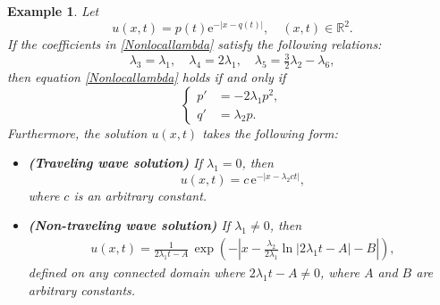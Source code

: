 \documentclass[11pt]{article}
\newtheorem{example}{Example}
\begin{document}
\begin{example}
    \label{1peakoncorollary}
Let
\[
u(x,t) =  p(t) \mathrm{e}^{-|x-q(t)|},\quad (x,t) \in \mathbb{R}^2.
\]
If the coefficients in \eqref{Nonlocallambda} satisfy  the following relations:
\[
\lambda_3 = \lambda_1,\quad \lambda_4 = 2\lambda_1,\quad \lambda_5 = \tfrac{3}{2}\lambda_2 - \lambda_6,
\]
then equation \eqref{Nonlocallambda} holds if and only if
\begin{equation}
\left\{
\begin{aligned}
    p' &= -2\lambda_1 p^2, \\
    q' &= \lambda_2 p.
\end{aligned}
\right.
\label{1peakonODE}
\end{equation}
Furthermore, the solution \( u(x,t) \) takes the following form:
\begin{itemize}
    \item \textbf{(Traveling wave solution)} If \( \lambda_1 = 0 \), then
    \[
    u(x,t) = c\, \mathrm{e}^{-|x - \lambda_2 ct|},
    \]
    where \( c \) is an arbitrary constant.
    \item \textbf{(Non-traveling wave solution)} If $\lambda_1 \neq 0$, then
\begin{eqnarray}\label{NTWS}
u(x,t) = \frac{1}{2\lambda_1 t - A}\, \exp\left(-\left| x - \frac{\lambda_2}{2\lambda_1} \ln|2\lambda_1 t - A| - B \right|\right),
\end{eqnarray}
defined on any connected domain where $2\lambda_1 t - A \neq 0$, 
where $A$ and $B$ are arbitrary constants.

\end{itemize}
\end{example}
\end{document}
